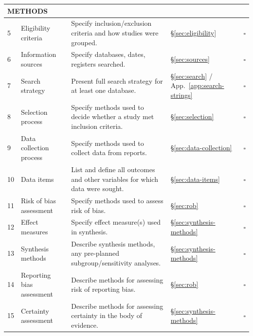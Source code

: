 \begin{longtable}{p{0.5cm} p{3cm} p{6cm} p{2cm} p{1.5cm}}
\multicolumn{5}{l}{\textbf{METHODS}} \\
\midrule
5 & Eligibility criteria & Specify inclusion/exclusion criteria and how studies were grouped. & \S\ref{sec:eligibility} & $\square$ \\
6 & Information sources & Specify databases, dates, registers searched. & \S\ref{sec:sources} & $\square$ \\
7 & Search strategy & Present full search strategy for at least one database. & \S\ref{sec:search} / App.~\ref{app:search-strings} & $\square$ \\
8 & Selection process & Specify methods used to decide whether a study met inclusion criteria. & \S\ref{sec:selection} & $\square$ \\
9 & Data collection process & Specify methods used to collect data from reports. & \S\ref{sec:data-collection} & $\square$ \\
10 & Data items & List and define all outcomes and other variables for which data were sought. & \S\ref{sec:data-items} & $\square$ \\
11 & Risk of bias assessment & Specify methods used to assess risk of bias. & \S\ref{sec:rob} & $\square$ \\
12 & Effect measures & Specify effect measure(s) used in synthesis. & \S\ref{sec:synthesis-methods} & $\square$ \\
13 & Synthesis methods & Describe synthesis methods, any pre-planned subgroup/sensitivity analyses. & \S\ref{sec:synthesis-methods} & $\square$ \\
14 & Reporting bias assessment & Describe methods for assessing risk of reporting bias. & \S\ref{sec:rob} & $\square$ \\
15 & Certainty assessment & Describe methods for assessing certainty in the body of evidence. & \S\ref{sec:synthesis-methods} & $\square$ \\
\midrule


\end{longtable}
